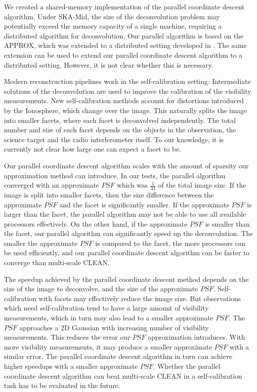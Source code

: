 We created a shared-memory implementation of the parallel coordinate descent algorithm. Under SKA-Mid, the size of the deconvolution problem may potentially exceed the memory capacity of a single machine, requiring a distributed algorithm for deconvolution. Our parallel algorithm is based on the APPROX\cite{fercoq2015accelerated}, which was extended to a distributed setting developed in \cite{fercoqfast}. The same extension can be used to extend our parallel coordinate descent algorithm to a distributed setting. However, it is not clear whether this is necessary.

Modern reconstruction pipelines work in the self-calibration setting: Intermediate solutions of the deconvolution are used to improve the calibration of the visibility measurements. New self-calibration methods account for distortions introduced by the Ionosphere, which change over the image. This naturally splits the image into smaller facets, where each facet is deconvolved independently\cite{van2016lofar}. The total number and size of each facet depends on the objects in the observation, the science target and the radio interferometer itself. To our knowledge, it is currently not clear how large one can expect a facet to be.

Our parallel coordinate descent algorithm scales with the amount of sparsity our approximation method can introduce. In our tests, the parallel algorithm converged with an approximate $PSF$ which was $\frac{1}{32}$ of the total image size. If the image is split into smaller facets, then the size difference between the approximate $PSF$ and the facet is significantly smaller. If the approximate $PSF$ is larger than the facet, the parallel algorithm may not be able to use all available processors effectively. On the other hand, if the approximate $PSF$ is smaller than the facet, our parallel algorithm can significantly speed up the deconvolution. The smaller the approximate $PSF$ is compared to the facet, the more processors can be used efficiently, and our parallel coordinate descent algorithm can be faster to converge than multi-scale CLEAN.

The speedup achieved by the parallel coordinate descent method depends on the size of the image to deconvolve, and the size of the approximate $PSF$. Self-calibration with facets may effectively reduce the image size. But observations which need self-calibration tend to have a large amount of visibility measurements, which in turn may also lead to a smaller approximate $PSF$. The $PSF$ approaches a 2D Gaussian with increasing number of visibility measurements. This reduces the error our $PSF$ approximation introduces. With more visibility measurements, it may produce a smaller approximate $PSF$ with a similar error. The parallel coordinate descent algorithm in turn can achieve higher speedups with a smaller approximate $PSF$. Whether the parallel coordinate descent algorithm can beat multi-scale CLEAN in a self-calibration task has to be evaluated in the future.

